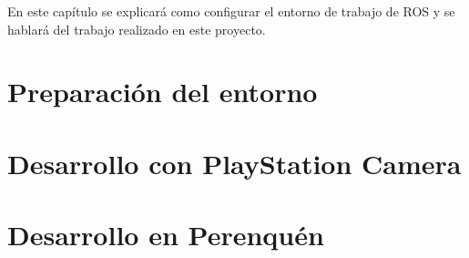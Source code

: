 
En este capítulo se explicará como configurar el entorno de trabajo de ROS y se
hablará del trabajo realizado en este proyecto.

\section{Preparación del entorno}
\label{4:sec1}


\section{Desarrollo con PlayStation Camera}
\label{4:sec2}




\section{Desarrollo en Perenquén}
\label{4:sec3}


